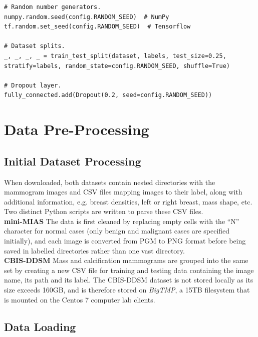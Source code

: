 \begin{lstlisting}[numbers=none]
# Random number generators.
numpy.random.seed(config.RANDOM_SEED)  # NumPy
tf.random.set_seed(config.RANDOM_SEED)  # Tensorflow

# Dataset splits.
_, _, _, _ = train_test_split(dataset, labels, test_size=0.25, stratify=labels, random_state=config.RANDOM_SEED, shuffle=True)

# Dropout layer.
fully_connected.add(Dropout(0.2, seed=config.RANDOM_SEED))
\end{lstlisting}


\section{Data Pre-Processing}

\subsection{Initial Dataset Processing}

When downloaded, both datasets contain nested directories with the mammogram images and CSV files mapping images to their label, along with additional information, e.g. breast densities, left or right breast, mass shape, etc. Two distinct Python scripts are written to parse these CSV files.\\

\textbf{mini-MIAS} \space The data is first cleaned by replacing empty cells with the ``N'' character for normal cases (only benign and malignant cases are specified initially), and each image is converted from PGM to PNG format before being saved in labelled directories rather than one vast directory.\\

\textbf{CBIS-DDSM} \space Mass and calcification mammograms are grouped into the same set by creating a new CSV file for training and testing data containing the image name, its path and its label. The CBIS-DDSM dataset is not stored locally as its size exceeds 160GB, and is therefore stored on \textit{BigTMP}, a 15TB filesystem that is mounted on the Centos 7 computer lab clients.


\subsection{Data Loading}

